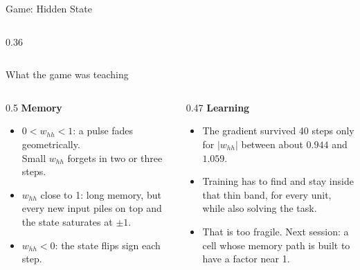 \documentclass[aspectratio=169,10pt]{beamer}
\begin{document}
\begin{frame}{Game: Hidden State}
  \begin{columns}[c]
    \begin{column}{0.36\textwidth}
      \centering
      \\[0.4em]
      {\scriptsize\ttfamily \gameurlshort}
    \end{column}
  \end{columns}
\end{frame}

\begin{frame}{What the game was teaching}
  \begin{columns}[T]
    \begin{column}{0.5\textwidth}
      \textbf{Memory}
      \begin{itemize}
        \item $0<w_{hh}<1$: a pulse fades geometrically.\\ Small $w_{hh}$ forgets in two or three steps.
        \item $w_{hh}$ close to 1: long memory, but every new input piles on top and the state saturates at $\pm1$.
        \item $w_{hh}<0$: the state flips sign each step.
      \end{itemize}
    \end{column}
    \begin{column}{0.47\textwidth}
      \textbf{Learning}
      \begin{itemize}
        \item The gradient survived 40 steps only for $|w_{hh}|$ between about $0.944$ and $1.059$.
        \item Training has to find and stay inside that thin band, for every unit, while also solving the task.
        \item That is too fragile. Next session: a cell whose memory path is built to have a factor near 1.
      \end{itemize}
    \end{column}
  \end{columns}
\end{frame}
\end{document}
